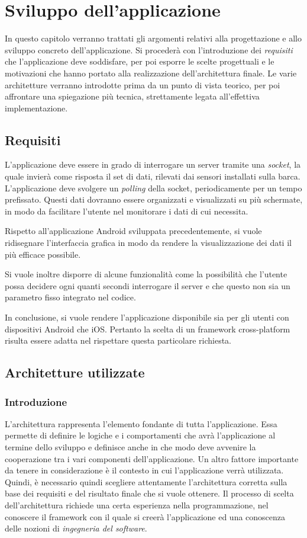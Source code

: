  \chapter{Sviluppo dell'applicazione}
In questo capitolo verranno trattati gli argomenti relativi alla progettazione e allo sviluppo concreto dell'applicazione. Si procederà con l'introduzione dei \textit{requisiti} che l'applicazione deve soddisfare, per poi esporre le scelte progettuali e le motivazioni che hanno portato alla realizzazione dell'architettura finale. Le varie architetture verranno introdotte prima da un punto di vista teorico, per poi affrontare una spiegazione più tecnica, strettamente legata all'effettiva implementazione.

\section{Requisiti}
L'applicazione deve essere in grado di interrogare un server tramite una \textit{socket}, la quale invierà come risposta il set di dati, rilevati dai sensori installati sulla barca. L'applicazione deve svolgere un \textit{polling} della socket, periodicamente per un tempo prefissato. Questi dati dovranno essere organizzati e visualizzati su più schermate, in modo da facilitare l'utente nel monitorare i dati di cui necessita.

Rispetto all'applicazione Android sviluppata precedentemente, si vuole ridisegnare l'interfaccia grafica in modo da rendere la visualizzazione dei dati il più efficace possibile.

Si vuole inoltre disporre di alcune funzionalità come la possibilità che l'utente possa decidere ogni quanti secondi interrogare il server e che questo non sia un parametro fisso integrato nel codice.

In conclusione, si vuole rendere l'applicazione disponibile sia per gli utenti con dispositivi Android che iOS. Pertanto la scelta di un framework cross-platform risulta essere adatta nel rispettare questa particolare richiesta.

\section{Architetture utilizzate}

\subsection{Introduzione}
L'architettura rappresenta l'elemento fondante di tutta l'applicazione. Essa permette di definire le logiche e i comportamenti che avrà l'applicazione al termine dello sviluppo e definisce anche in che modo deve avvenire la cooperazione tra i vari componenti dell'applicazione. Un altro fattore importante da tenere in considerazione è il contesto in cui l'applicazione verrà utilizzata. Quindi, è necessario quindi scegliere attentamente l'architettura corretta sulla base dei requisiti e del risultato finale che si vuole ottenere. Il processo di scelta dell'architettura richiede una certa esperienza nella programmazione, nel conoscere il framework con il quale si creerà l'applicazione ed una conoscenza delle nozioni di \textit{ingegneria del software}.

